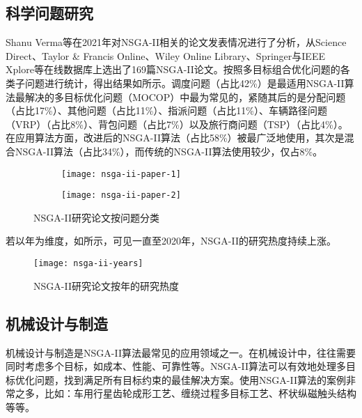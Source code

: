 \documentclass[lang=cn,a4paper,citestyle=gb7714-2015, bibstyle=gb7714-2015]{elegantpaper}
\newcommand{\mycite}[1]{\textsuperscript{\parencite{#1}}}
\begin{document}
    \subsection{科学问题研究}

    Shanu Verma等在2021年对NSGA-II相关的论文发表情况进行了分析\mycite{Verma2021}，从Science Direct、Taylor \& Francis Online、Wiley Online Library、Springer与IEEE Xplore等在线数据库上选出了169篇NSGA-II论文。按照多目标组合优化问题的各类子问题进行统计，得出结果如所示。调度问题（占比42\%）是最适用NSGA-II算法最解决的多目标优化问题（MOCOP）中最为常见的，紧随其后的是分配问题（占比17\%）、其他问题（占比11\%）、指派问题（占比11\%）、车辆路径问题（VRP）（占比8\%）、背包问题（占比7\%）以及旅行商问题（TSP）（占比4\%）。在应用算法方面，改进后的NSGA-II算法（占比58\%）被最广泛地使用，其次是混合NSGA-II算法（占比34\%），而传统的NSGA-II算法使用较少，仅占8\%。
    \begin{figure}[!h]
        \centering
        \begin{subfigure}[h]{0.4\textwidth}
            \texttt{[image: nsga-ii-paper-1]}
        \end{subfigure}
        \begin{subfigure}[h]{0.4\textwidth}
            \texttt{[image: nsga-ii-paper-2]}
        \end{subfigure}
        \caption{NSGA-II研究论文按问题分类}
        \label{fig:nsga-ii-paper}
    \end{figure}

    若以年为维度，如所示，可见一直至2020年，NSGA-II的研究热度持续上涨。

    \begin{figure}[!h]
        \centering
            \texttt{[image: nsga-ii-years]}
        \caption{NSGA-II研究论文按年的研究热度}
        \label{fig:nsga-ii-years}
    \end{figure}

    \subsection{机械设计与制造}

    机械设计与制造是NSGA-II算法最常见的应用领域之一。在机械设计中，往往需要同时考虑多个目标，如成本、性能、可靠性等。NSGA-II算法可以有效地处理多目标优化问题，找到满足所有目标约束的最佳解决方案。使用NSGA-II算法的案例非常之多，比如：车用行星齿轮成形工艺\mycite{DYJE202410008}、缠绕过程多目标工艺\mycite{FUHE202410040}、杯状纵磁触头结构\mycite{DGJS202223015}等等。
\end{document}
